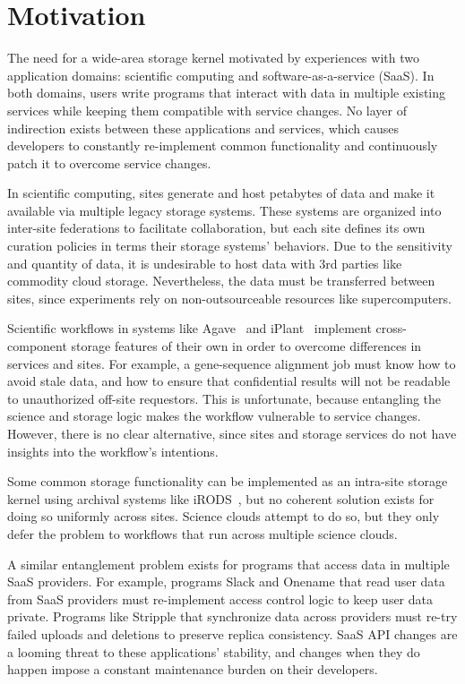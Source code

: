 \section{Motivation}
\label{sec:motivation}

The need for a wide-area storage kernel motivated by experiences with two application domains:
scientific computing and software-as-a-service (SaaS). In both domains, users
write programs that interact with data in multiple existing services while
keeping them compatible with service changes.  No layer of indirection exists
between these applications and services, which causes developers to constantly
re-implement common functionality and continuously patch it to overcome service
changes.

In scientific computing, sites generate and host petabytes of data and make it
available via multiple legacy storage systems.  These systems are organized
into inter-site federations to facilitate collaboration, but each site defines
its own curation policies in terms their storage systems' behaviors. Due
to the sensitivity and quantity of data, it is undesirable to host data with 3rd
parties like commodity cloud storage. Nevertheless, the data must be transferred
between sites, since experiments rely on non-outsourceable resources like
supercomputers.

Scientific workflows in systems like Agave~\cite{agave} and iPlant~\cite{iplant}
implement cross-component storage features of their own in
order to overcome differences in services and sites.  For example, a
gene-sequence alignment job must know how to avoid stale data, and how to ensure
that confidential results will not be readable to unauthorized off-site
requestors. This is unfortunate, because entangling the science and storage
logic makes the workflow vulnerable to service changes.  However, there is no
clear alternative, since sites and storage services do not have insights into
the workflow's intentions.

Some common storage functionality can be implemented as an intra-site storage
kernel using archival systems like iRODS~\cite{irods}, but no
coherent solution exists for doing so uniformly across sites. Science clouds
attempt to do so, but they only defer the problem to workflows that run across
multiple science clouds.

A similar entanglement problem exists for programs that access data in multiple
SaaS providers.  For example, programs Slack and Onename that read user data
from SaaS providers must re-implement access control logic to keep user
data private.  Programs like Stripple that synchronize data across providers
must re-try failed uploads and deletions to preserve replica consistency. 
SaaS API changes are a looming threat to these applications' stability, and 
changes when they do happen impose a constant
maintenance burden on their developers.

